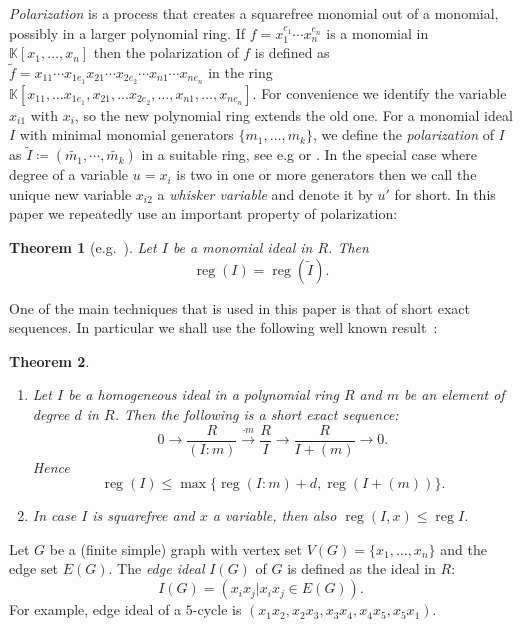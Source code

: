 \documentclass[10pt]{article}
\newtheorem{theorem}{Theorem}[section]
\theoremstyle{definition}
\numberwithin{equation}{section}
\newcommand \reg{\operatorname{reg}}
\newcommand \K{\mathbb{K}}
\begin{document}
    \emph{Polarization} is a process that creates a squarefree monomial out of a monomial, possibly in a larger polynomial ring. If $f=x_1^{e_1}\cdots x_n^{e_n}$ is a monomial in $\mathbb{K}[x_1, \ldots , x_n]$ then the polarization of $f$ is defined as $\tilde{f}=x_{11}\cdots x_{1e_1} x_{21} \cdots x_{2e_2}\cdots x_{n1} \cdots x_{n e_n}$ in the ring $\mathbb{K}[x_{11},\ldots x_{1e_1}, x_{21},\ldots x_{2e_2}, \ldots,  x_{n1}, \ldots, x_{ne_n}]$.
    For convenience
    we identify the variable $x_{i1}$ with $x_i$, so the new polynomial ring extends the old one.
    For a monomial ideal $I$ with minimal monomial generators $\{m_1,\ldots, m_k\}$, we define the \emph{polarization} of $I$ as $\widetilde{I}\coloneqq(\widetilde{m_1}, \cdots, \widetilde{m_k})$ in a suitable ring, see e.g
   \cite{Herzog'sBook} or \cite[Sec. 1.6]{kummini_thesis}. In the special case where degree of a variable $u=x_i$ is two in one or more generators then we call the unique new variable $x_{i2}$ a \emph{whisker variable} and denote it by $u'$ for short.
  In this paper we repeatedly use an important property of 
polarization:
\begin{theorem}[e.g.~{\cite[Cor. 1.6.3(a)]{kummini_thesis}}] Let $I$ be a monomial
ideal in $R$.
Then
$$\reg(I)=\reg(\widetilde{I}).$$
\label{thm:2.1}
\end{theorem}

One of the main techniques that is used in this paper is that of short exact sequences. 
In particular we shall use the following well known result~\cite[Lemma. 2.11]{banerjee}:

\begin{theorem}
\begin{enumerate}[label=(\roman*)]
\item Let $I$ be a homogeneous ideal in a polynomial ring $R$ and $m$ be an element of degree $d$ in $R$. Then the following is a short exact sequence: $$0 \longrightarrow \frac{R}{(I:m)} \overset{\cdot m} \longrightarrow \frac{R}{I} \longrightarrow \frac{R}{I+(m)} \longrightarrow 0.$$
Hence $$\reg(I) \leq \max \{\reg (I:m) +d, \reg (I+(m))\}.$$
\item In case $I$ is squarefree and $x$ a variable, then also $\reg(I,x) \leq \reg I$.
\end{enumerate}
\label{thm:2.2}
\end{theorem}


 Let $G$ be a (finite simple) graph with vertex set $V(G)=\{x_1, \ldots ,x_n\}$ and the edge set $E(G)$. The  \textit{edge ideal} $I(G)$ of $G$ is defined as the ideal in $R$: $$I(G)=(x_i x_j|x_ix_j \in E(G)).$$
 For example, edge ideal of a $5$-cycle is $(x_1x_2,x_2x_3,x_3x_4,x_4x_5,x_5x_1)$.
 
\end{document}
